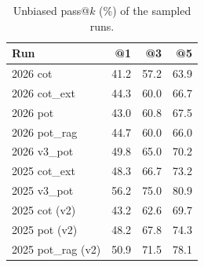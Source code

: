 \begin{table}[!t]
\centering
\footnotesize
\caption{Unbiased pass@$k$ (\%) of the sampled runs.}
\label{tab:passk}
\setlength{\tabcolsep}{3.5pt}
\begin{tabular}{lrrr}
\toprule
Run & @1 & @3 & @5 \\
\midrule
2026 cot & 41.2 & 57.2 & 63.9 \\
2026 cot\_ext & 44.3 & 60.0 & 66.7 \\
2026 pot & 43.0 & 60.8 & 67.5 \\
2026 pot\_rag & 44.7 & 60.0 & 66.0 \\
2026 v3\_pot & 49.8 & 65.0 & 70.2 \\
2025 cot\_ext & 48.3 & 66.7 & 73.2 \\
2025 v3\_pot & 56.2 & 75.0 & 80.9 \\
2025 cot (v2) & 43.2 & 62.6 & 69.7 \\
2025 pot (v2) & 48.2 & 67.8 & 74.3 \\
2025 pot\_rag (v2) & 50.9 & 71.5 & 78.1 \\
\bottomrule
\end{tabular}
\end{table}
